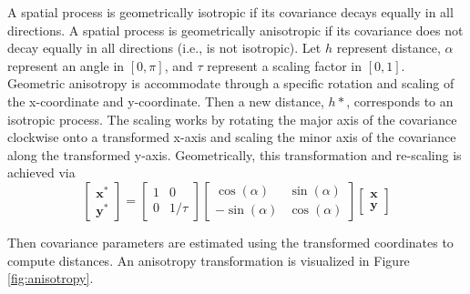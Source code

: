\documentclass{article}
\begin{document}
A spatial process is geometrically isotropic if its covariance decays
equally in all directions. A spatial process is geometrically
anisotropic if its covariance does not decay equally in all directions
(i.e., is not isotropic). Let \(h\) represent distance, \(\alpha\)
represent an angle in \([0, \pi]\), and \(\tau\) represent a scaling
factor in \([0, 1]\). Geometric anisotropy is accommodate through a
specific rotation and scaling of the x-coordinate and y-coordinate. Then
a new distance, \(h*\), corresponds to an isotropic process. The scaling
works by rotating the major axis of the covariance clockwise onto a
transformed x-axis and scaling the minor axis of the covariance along
the transformed y-axis. Geometrically, this transformation and
re-scaling is achieved via \begin{equation}
  \begin{bmatrix}
    \mathbf{x}^* \\
    \mathbf{y}^*
  \end{bmatrix} = 
  \begin{bmatrix}
    1 & 0 \\
    0 & 1 / \tau
  \end{bmatrix}
  \begin{bmatrix}
    \cos(\alpha) & \sin(\alpha) \\
    -\sin(\alpha) & \cos(\alpha)
  \end{bmatrix}  
  \begin{bmatrix}
    \mathbf{x} \\
    \mathbf{y}
  \end{bmatrix}
\end{equation}

Then covariance parameters are estimated using the transformed
coordinates to compute distances. An anisotropy transformation is
visualized in Figure\(~\)\ref{fig:anisotropy}.
\end{document}
